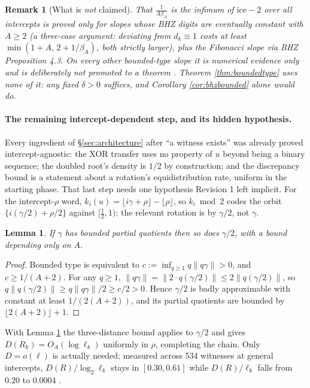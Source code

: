 \documentclass[11pt]{article}
\newtheorem{lemma}[theorem]{Lemma}
\newtheorem*{remark}{Remark}
\begin{document}
\begin{remark}[What is \emph{not} claimed]
That $\frac1{A\beta_A}$ \emph{is} the infimum of $\text{ice}-2$ over all intercepts is proved only
for slopes whose BHZ digits are eventually constant with $A\ge2$ (a three-case argument: deviating
from $d_k\equiv1$ costs at least $\min(1+A,\,2+1/\beta_A)$, both strictly larger), plus the
Fibonacci slope via BHZ Proposition 4.3. On every other bounded-type slope it is numerical evidence
only and is deliberately not promoted to a theorem \cite{Phase8Margin}. Theorem
\ref{thm:boundedtype} uses none of it: any fixed $\delta>0$ suffices, and Corollary
\ref{cor:bhzbounded} alone would do.
\end{remark}

\paragraph{The remaining intercept-dependent step, and its hidden hypothesis.} Every ingredient of
\S\ref{sec:architecture} after ``a witness exists'' was already proved intercept-agnostic: the XOR
transfer uses no property of $u$ beyond being a binary sequence; the doubled root's density is
$1/2$ by construction; and the discrepancy bound is a statement about a rotation's equidistribution
rate, uniform in the starting phase. That last step needs one hypothesis Revision 1 left implicit.
For the intercept-$\rho$ word, $k_i(u)=\lfloor i\gamma+\rho\rfloor-\lfloor\rho\rfloor$, so
$k_i\bmod2$ codes the orbit $\{i(\gamma/2)+\rho/2\}$ against $[\tfrac12,1)$: the relevant rotation
is by $\gamma/2$, not $\gamma$.

\begin{lemma}
\label{lem:halfslope}
If $\gamma$ has bounded partial quotients then so does $\gamma/2$, with a bound depending only on
$A$.
\end{lemma}

\begin{proof}
Bounded type is equivalent to $c:=\inf_{q\ge1}q\|q\gamma\|>0$, and $c\ge1/(A+2)$. For any $q\ge1$,
$\|q\gamma\|=\|2\cdot q(\gamma/2)\|\le2\|q(\gamma/2)\|$, so
$q\|q(\gamma/2)\|\ge q\|q\gamma\|/2\ge c/2>0$. Hence $\gamma/2$ is badly approximable with constant
at least $1/(2(A+2))$, and its partial quotients are bounded by $\lfloor2(A+2)\rfloor+1$.
\end{proof}

With Lemma \ref{lem:halfslope} the three-distance bound applies to $\gamma/2$ and gives
$D(R_k)=O_A(\log\ell_k)$ uniformly in $\rho$, completing the chain. Only $D=o(\ell)$ is actually
needed; measured across 534 witnesses at general intercepts, $D(R)/\log_2\ell_k$ stays in
$[0.30,0.61]$ while $D(R)/\ell_k$ falls from $0.20$ to $0.0004$ \cite{Phase8Chain}.
\end{document}
